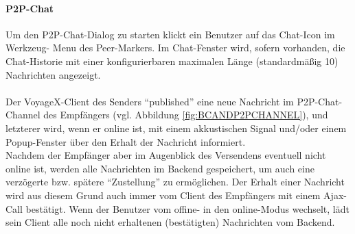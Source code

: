 \paragraph{P2P-Chat}
Um den P2P-Chat-Dialog zu starten klickt ein Benutzer auf das Chat-Icon im Werkzeug- Menu des Peer-Markers. 
Im Chat-Fenster wird, sofern vorhanden, die Chat-Historie mit einer konfigurierbaren maximalen Länge (standardmäßig 10) Nachrichten angezeigt.\\ \\
Der VoyageX-Client des Senders "`published"' eine neue Nachricht im P2P-Chat-Channel des Empfängers (vgl. Abbildung \ref{fig:BCANDP2PCHANNEL}), und letzterer wird, wenn er online ist, mit einem akkustischen Signal und/oder einem Popup-Fenster über den Erhalt der Nachricht informiert.\\
Nachdem der Empfänger aber im Augenblick des Versendens eventuell nicht online ist, werden alle Nachrichten im Backend gespeichert, um auch eine verzögerte bzw. spätere "`Zustellung"' zu ermöglichen. Der Erhalt einer Nachricht wird aus diesem Grund auch immer vom Client des Empfängers mit einem Ajax-Call bestätigt. Wenn der Benutzer vom offine- in den online-Modus wechselt, lädt sein Client alle noch nicht erhaltenen (bestätigten) Nachrichten vom Backend.\\

